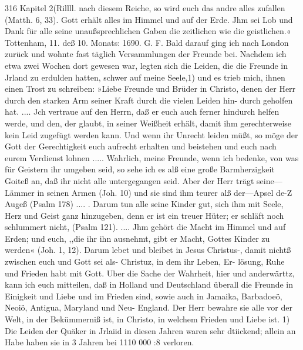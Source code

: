 316 Kapitel 2(Rillll.
nach diesem Reiche, so wird euch das andre alles zufallen
(Matth. 6, 33). Gott erhält alles im Himmel und auf der Erde.
Jhm sei Lob und Dank für alle seine unaußsprechlichen Gaben
die zeitlichen wie die geistlichen.«
Tottenham, 11. deß 10. Monats: 1690. G. F.
Bald darauf ging ich nach London zurück und wohnte fast
täglich Versammlungen der Freunde bei. Nachdem ich etwa zwei
Wochen dort gewesen war, legten sich die Leiden, die die Freunde
in Jrland zu erdulden hatten, schwer auf meine Seele,1) und es
trieb mich, ihnen einen Trost zu schreiben:
»Liebe Freunde und Brüder in Christo, denen der Herr
durch den starken Arm seiner Kraft durch die vielen Leiden hin-
durch geholfen hat. .... Jch vertraue auf den Herrn, daß er
euch auch ferner hindurch helfen werde, und den, der glaubt, in
seiner Weißheit erhält, damit ihm gerechterweise kein Leid zugefügt
werden kann. Und wenn ihr Unrecht leiden müßt, so möge der
Gott der Gerechtigkeit euch aufrecht erhalten und beistehen und
euch nach eurem Verdienst lohnen ..... Wahrlich, meine Freunde,
wenn ich bedenke, von was für Geistern ihr umgeben seid, so
sehe ich es alß eine große Barmherzigkeit Goiteß an, daß ihr
nicht alle untergegangen seid. Aber der Herr trägt seine—Lämmer
in seinen Armen (Joh. 10) und sie sind ihm teurer alß der—Apsel
de-Z Augeß (Psalm 178) .... . Darum tun alle seine Kinder gut,
sich ihm mit Seele, Herz und Geist ganz hinzugeben, denn er
ist ein treuer Hüter; er schläft noch schlummert nicht, (Psalm 121).
.... Jhm gehört die Macht im Himmel und auf Erden; und
euch, ,,die ihr ihn ausnehmt, gibt er Macht, Gottes Kinder zu
werden« (Joh. 1, 12).
Darum lebet und bleibet in Jesus Christus-, damit nichtß
zwischen euch und Gott sei als- Christuz, in dem ihr Leben, Er-
lösung, Ruhe und Frieden habt mit Gott.
Uber die Sache der Wahrheit, hier und anderwärttz, kann
ich euch mitteilen, daß in Holland und Deutschland überall die
Freunde in Einigkeit und Liebe und im Frieden sind, sowie auch
in Jamaika, Barbadoeö, Neoiö, Antigua, Maryland und Neu-
England. Der Herr bewahre sie alle vor der Welt, in der
Bekümmerniß ist, in Christo, in welchem Frieden und Liebe ist.
1) Die Leiden der Quäker in Jrlaiid in diesen Jahren waren sehr
dtiickend; allein an Habe haben sie in 3 Jahren bei 1110 000 :8 verloren.


